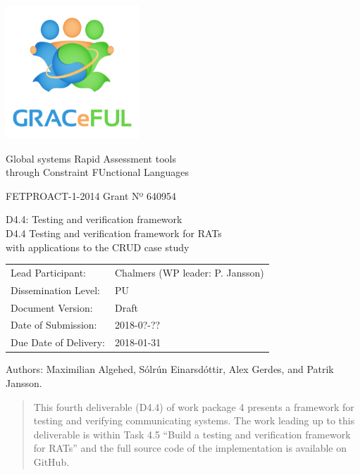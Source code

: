 \documentclass{article}
\author{}
\date{}
\begin{document}
\begin{center}
\includegraphics[width=5cm]{../coverpage/GRACeFULlogo.png}

\textcolor{GRACeFULblue}{Global systems Rapid Assessment tools\\
through Constraint FUnctional Languages}

\vspace{1cm}

FETPROACT-1-2014 Grant Nº 640954

\end{center}

\begin{framed}
\begin{center}
\Large
D4.4: Testing and verification framework\\[1ex]

\large
D4.4 Testing and verification framework for RATs\\
with applications to the CRUD case study\\[1ex]

\end{center}
\end{framed}

\vspace{1cm}

\noindent
\begin{tabular}{@{}ll@{}}
  Lead Participant:       & Chalmers (WP leader: P. Jansson)
\\Dissemination Level:    & PU
\\Document Version:       & Draft
\\Date of Submission:     & 2018-0?-??
\\Due Date of Delivery:   & 2018-01-31
\end{tabular}

Authors: Maximilian Algehed, Sólrún Einarsdóttir, Alex Gerdes, and
Patrik Jansson.

\begin{abstract}

This fourth deliverable (D4.4) of work package 4 presents a framework for
testing and verifying communicating systems.
%
The work leading up to this deliverable is within Task 4.5 ``Build a
testing and verification framework for RATs'' and the full source code
of the implementation is available on GitHub.

\end{abstract}
\newpage
\end{document}
